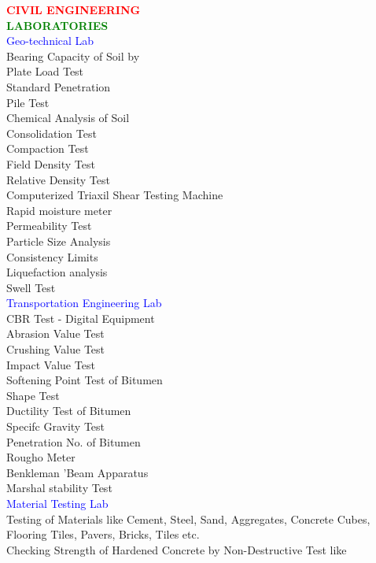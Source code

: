 \textcolor{red}{\bf{\Large CIVIL ENGINEERING }}\\
\textcolor{green}{\bf \large LABORATORIES}\\
\textcolor{blue}{Geo-technical Lab}\\
\large Bearing Capacity of Soil by \\
Plate Load Test\\
Standard Penetration\\
\large Pile Test\\
\large Chemical Analysis of Soil\\
\large Consolidation Test\\
\large Compaction Test \\
\large Field Density Test \\
\large Relative Density Test\\
\large Computerized Triaxil Shear Testing Machine\\
\large Rapid moisture meter\\
\large Permeability Test\\
\large Particle Size Analysis\\
\large Consistency Limits\\
\large Liquefaction analysis\\
\large Swell Test\\
\textcolor{blue}{Transportation Engineering Lab}\\
\large CBR Test - Digital Equipment\\
\large Abrasion Value Test \\
\large Crushing Value Test \\
\large Impact Value Test\\
\large Softening Point Test of Bitumen \\
\large Shape Test \\
\large Ductility Test of Bitumen\\
\large Specifc Gravity Test \\
\large Penetration No. of Bitumen\\
\large Rougho Meter \\
\large Benkleman 'Beam Apparatus\\
\large Marshal stability Test\\
\textcolor{blue}{Material Testing Lab}\\
\large Testing of Materials like Cement, Steel, Sand, Aggregates, Concrete Cubes, Flooring Tiles, Pavers, Bricks, Tiles etc.\\
\large Checking Strength of Hardened Concrete by Non-Destructive Test like \\
